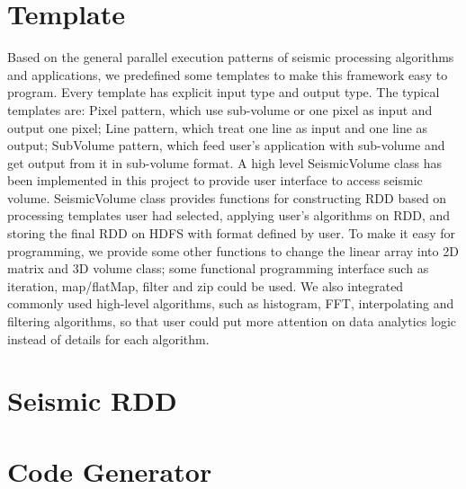 

\section{Template}

Based on the general parallel execution patterns of seismic processing algorithms and applications, we predefined some templates to make this framework easy to program. Every template has explicit input type and output type. The typical templates are: Pixel pattern, which use sub-volume or one pixel as input and output one pixel; Line pattern, which treat one line as input and one line as output; SubVolume pattern, which feed user’s application with sub-volume and get output from it in sub-volume format. A high level SeismicVolume class has been implemented in this project to provide user interface to access seismic volume. SeismicVolume class provides functions for constructing RDD based on processing templates user had selected, applying user's algorithms on RDD, and storing the final RDD on HDFS with format defined by user. To make it easy for programming, we provide some other functions to change the linear array into 2D matrix and 3D volume class; some functional programming interface such as iteration, map/flatMap, filter and zip could be used. We also integrated commonly used high-level algorithms, such as histogram, FFT, interpolating and filtering algorithms, so that user could put more attention on data analytics logic instead of details for each algorithm.

\section{Seismic RDD}


\section{Code Generator}

